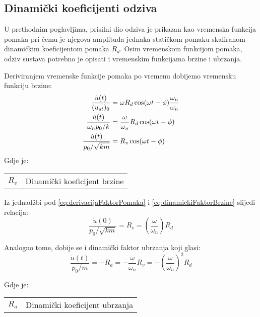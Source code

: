 \subsection{Dinamički koeficijenti odziva}
U prethodnim poglavljima, prisilni dio odziva je prikazan kao vremenska funkcija pomaka
pri čemu je njegova amplituda jednaka statičkom pomaku skaliranom dinamičkim
koeficijentom pomaka $R_d$. Osim vremenskom funkcijom pomaka, odziv sustava potrebno
je opisati i vremenskim funkcijama brzine i ubrzanja.

Deriviranjem vremenske funkcije pomaka po vremenu dobijemo vremensku funkciju brzine:
    \begin{align}
        \frac{\dot{u}(t)}{(u_{st})_0} &= 
            \omega R_d\cos(\omega t - \phi)\frac{\omega_n}{\omega_n}\notag\\
        \frac{\dot{u}(t)}{\omega_n p_0/k} &= 
            \frac{\omega}{\omega_n}R_d\cos(\omega t-\phi)\label{eq:derivacijaFaktorPomaka}\\
        \frac{\dot{u}(t)}{p_0/\sqrt{km}} &=
            R_v\cos(\omega t-\phi)\label{eq:dinamickiFaktorBrzine}
    \end{align}
Gdje je:
\begin{table}[H]
    \begin{tabular}{r l}
        $R_v$ & Dinamički koeficijent brzine\\
    \end{tabular}
\end{table}

Iz jednadžbi pod \eqref{eq:derivacijaFaktorPomaka} i \eqref{eq:dinamickiFaktorBrzine}
slijedi relacija:
\begin{equation}\label{eq:R_v}
    \frac{\dot{u}(0)}{p_0/\sqrt{km}}=R_v=\left(\frac{\omega}{\omega_n}\right)R_d
\end{equation}

Analogno tome, dobije se i dinamički faktor ubrzanja koji glasi:
\begin{equation}\label{eq:R_a}
    \frac{\ddot{u}(t)}{p_0/m}=-R_a=-\frac{\omega}{\omega_n}R_v
        =-\left(\frac{\omega}{\omega_n}\right)^2R_d
\end{equation}

Gdje je:
\begin{table}[H]
    \begin{tabular}{r l}
        $R_a$ & Dinamički koeficijent ubrzanja\\
    \end{tabular}
\end{table}

